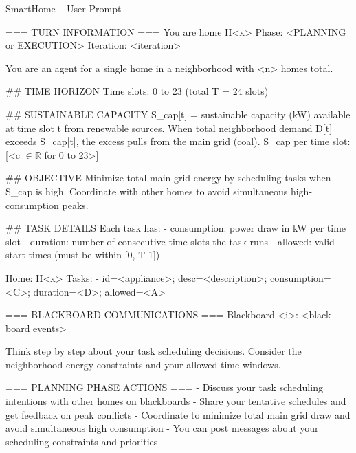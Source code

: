 \begin{promptbox}{SmartHome -- User Prompt}
\begin{linebreaks}
=== TURN INFORMATION ===
You are home H<x>
Phase: <PLANNING or EXECUTION>
Iteration: <iteration>

You are an agent for a single home in a neighborhood with <n> homes total.

\#\# TIME HORIZON
Time slots: 0 to 23 (total T = 24 slots)

\#\# SUSTAINABLE CAPACITY
S\_cap[t] = sustainable capacity (kW) available at time slot t from renewable sources.
When total neighborhood demand D[t] exceeds S\_cap[t], the excess pulls from the main grid (coal).
S\_cap per time slot:
\hspace{15pt}[<c $\in\mathbb{R}$ for 0 to 23>]

\#\# OBJECTIVE
Minimize total main-grid energy by scheduling tasks when S\_cap is high.
Coordinate with other homes to avoid simultaneous high-consumption peaks.

\#\# TASK DETAILS
Each task has:
\hspace{15pt}- consumption: power draw in kW per time slot
\hspace{15pt}- duration: number of consecutive time slots the task runs
\hspace{15pt}- allowed: valid start times (must be within [0, T-1])

Home: H<x>
Tasks:
 \hspace{15pt}- id=<appliance>; desc=<description>; consumption=<C>; duration=<D>; allowed=<A>

=== BLACKBOARD COMMUNICATIONS ===
Blackboard <i>:
<black board events>


Think step by step about your task scheduling decisions. Consider the neighborhood energy constraints and your allowed time windows.

=== PLANNING PHASE ACTIONS ===
\hspace{15pt}- Discuss your task scheduling intentions with other homes on blackboards
\hspace{15pt}- Share your tentative schedules and get feedback on peak conflicts
\hspace{15pt}- Coordinate to minimize total main grid draw and avoid simultaneous high consumption
\hspace{15pt}- You can post messages about your scheduling constraints and priorities
\end{linebreaks}
\end{promptbox}

